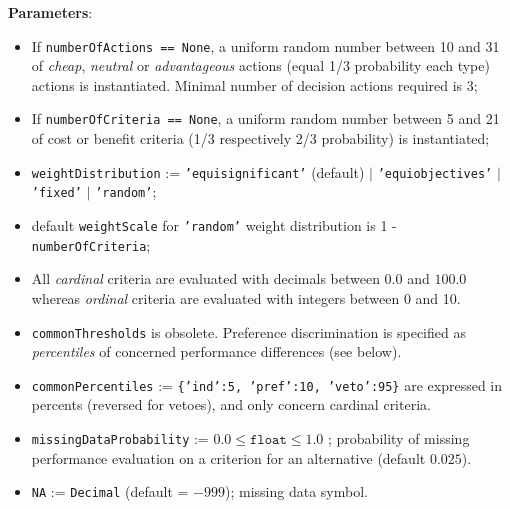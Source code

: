\noindent \textbf{Parameters}:
\begin{itemize}[leftmargin=0.5cm,rightmargin=0.5cm]
\item If \texttt{numberOfActions == None}, a uniform random number between 10 and 31 of \emph{cheap}, \emph{neutral} or \emph{advantageous} actions (equal 1/3 probability each type) actions is instantiated. Minimal number of decision actions required is 3; 
 \item If \texttt{numberOfCriteria == None}, a uniform random number between 5 and 21 of cost or benefit criteria (1/3 respectively 2/3 probability) is instantiated;
\item \texttt{weightDistribution} :=  \texttt{'equisignificant'} (default) $|$
 \texttt{'equi\-objectives'} $|$ \texttt{'fixed'} $|$ \texttt{'random'};
\item default \texttt{weightScale} for \texttt{'random'} weight distribution is 1 - \texttt{number\-OfCriteria};
\item All \emph{cardinal} criteria are evaluated with decimals between $0.0$ and $100.0$ whereas \emph{ordinal} criteria are evaluated with integers between 0 and 10.
\item \texttt{commonThresholds} is obsolete. Preference discrimination is specified as \emph{percentiles} of concerned performance differences (see below).
\item \texttt{commonPercentiles} := \texttt{\{'ind':5, 'pref':10, 'veto':95\}} are expressed in percents (reversed for vetoes), and only concern cardinal criteria.
\item \texttt{missingDataProbability} := $0.0 \leq \mathtt{float} \leq 1.0$ ; probability of missing performance evaluation on a criterion for an alternative (default $0.025$).
\item \texttt{NA} := \texttt{Decimal} (default = $-999$); missing data symbol. 
\end{itemize}

